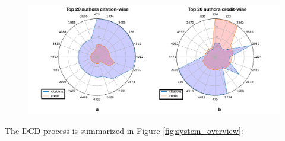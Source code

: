 \begin{figure}
	\includegraphics{./figures/2_radars}
\end{figure}

\vspace{0.15in}
The DCD process is summarized in Figure \ref{fig:system_overview}:
\vspace{0.15in}
